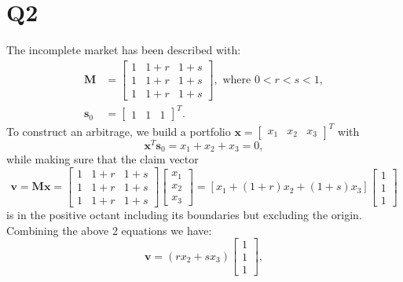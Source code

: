 \documentclass[final,3p,times]{elsarticle}
\begin{document}
\section{Q2}
	The incomplete market has been described with:
	\begin{equation}
		\begin{aligned}
			\mathbf{M}&=
				\begin{bmatrix}
					1 & 1+r & 1+s \\
					1 & 1+r & 1+s \\
					1 & 1+r & 1+s
				\end{bmatrix},
				\text{ where } 0<r<s<1
				,\\
			\mathbf{s}_0&= \begin{bmatrix} 1 & 1 & 1 \end{bmatrix}^T.
		\end{aligned}
	\end{equation}
	To construct an arbitrage, we build a portfolio $\mathbf{x}=\begin{bmatrix} x_1 & x_2 & x_3 \end{bmatrix}^T$ with
	\begin{equation}
		\mathbf{x}^T \mathbf{s}_0 = x_1+x_2+x_3 = 0
		,
	\end{equation}
	while making sure that the claim vector
	\begin{equation}
		\mathbf{v}=\mathbf{M} \mathbf{x}
		=
		\begin{bmatrix} 1 & 1+r & 1+s \\ 1 & 1+r & 1+s \\ 1 & 1+r & 1+s \end{bmatrix}
		\begin{bmatrix} x_1 \\ x_2 \\ x_3 \end{bmatrix}
		=
		\left[x_1+\left(1+r\right)x_2+\left(1+s\right)x_3\right]
		\begin{bmatrix} 1 \\ 1 \\ 1 \end{bmatrix}
	\end{equation}
	is in the positive octant including its boundaries but excluding the origin. Combining the above 2 equations we have:
	\begin{equation}
		\mathbf{v}=
		\left(r x_2+s x_3\right)
		\begin{bmatrix} 1 \\ 1 \\ 1 \end{bmatrix}
		,
	\end{equation}
\end{document}

